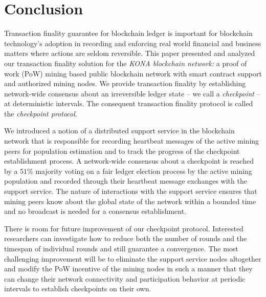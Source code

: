 \documentclass[conference]{IEEEtran}
\begin{document}




    



    
        




\section{Conclusion}
\label{s-conclusion}
Transaction finality guarantee for blockchain ledger is important for blockchain technology's adoption in recording and enforcing real world financial and business matters where actions are seldom reversible. This paper presented and analyzed our transaction finality solution for the \textit{KONA blockchain network:} a proof of work (PoW) mining based public blockchain network with smart contract support and authorized mining nodes. We provide transaction finality by establishing network-wide consensus about an irreversible ledger state -- we call a \textit{checkpoint} -- at deterministic intervals. The consequent transaction finality protocol is called the \textit{checkpoint protocol}.   

We introduced a notion of a distributed support service in the blockchain network that is responsible for recording heartbeat messages of the active mining peers for population estimation and to track the progress of the checkpoint establishment process. A network-wide consensus about a checkpoint is reached by a $51\%$ majority voting on a fair ledger election process by the active mining population and recorded through their heartbeat message exchanges with the support service. The nature of interactions with the support service ensures that mining peers know about the global state of the network within a bounded time and no broadcast is needed for a consensus establishment. 

There is room for future improvement of our checkpoint protocol. Interested researchers can investigate how to reduce both the number of rounds and the timespan of individual rounds and still guarantee a convergence. The most challenging improvement will be to eliminate the support service nodes altogether and modify the PoW incentive of the mining nodes in such a manner that they can change their network connectivity and participation behavior at periodic intervals to establish checkpoints on their own.   
  



\end{document}

